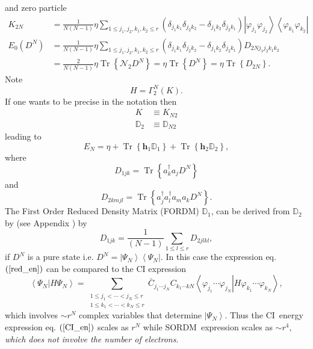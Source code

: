 \documentclass[aps,preprint]{revtex4}%
\begin{document}
and zero particle
\begin{align}
K_{2N}  &  =\frac{1}{N\left(  N-1\right)  }\eta\sum_{1\leq j_{1},j_{2}%
,k_{1},k_{2}\leq r}\left(  \delta_{j_{1}k_{1}}\delta_{j_{2}k_{2}}%
-\delta_{j_{1}k_{2}}\delta_{j_{2}k_{1}}\right)  \left\vert \varphi_{j_{1}%
}\varphi_{j_{2}}\right\rangle \left\langle \varphi_{k_{1}}\varphi_{k_{2}%
}\right\vert \nonumber\\
E_{0}\left(  D^{N}\right)   &  =\frac{1}{N\left(  N-1\right)  }\eta\sum_{1\leq
j_{1},j_{2},k_{1},k_{2}\leq r}\left(  \delta_{j_{1}k_{1}}\delta_{j_{2}k_{2}%
}-\delta_{j_{1}k_{2}}\delta_{j_{2}k_{1}}\right)  D_{2Nj_{1}j_{2}k_{1}k_{2}%
}\nonumber\\
&  =\frac{2}{N\left(  N-1\right)  }\eta\operatorname{Tr}\left\{
\mathcal{N}_{2}D^{N}\right\}  =\eta\operatorname{Tr}\left\{  D^{N}\right\}
=\eta\operatorname{Tr}\left\{  D_{2N}\right\}  .
\end{align}
Note
\begin{equation}
H=\Gamma_{2}^{N}\left(  K\right)  .
\end{equation}
If one wants to be precise in the notation then
\begin{align}
K  &  \equiv K_{N2}\\
\mathbb{D}_{2}  &  \equiv\mathbb{D}_{N2}%
\end{align}
leading to
\begin{equation}
E_{N}=\eta+\operatorname{Tr}\left\{  \mathbf{h}_{1}\mathbb{D}_{1}\right\}
+\operatorname{Tr}\left\{  \mathbf{h}_{2}\mathbb{D}_{2}\right\}  ,
\label{red_en}%
\end{equation}
where
\begin{equation}
D_{1jk}=\operatorname{Tr}\left\{  a_{k}^{\dagger}a_{j}D^{N}\right\}
\end{equation}
and
\begin{equation}
D_{2kmjl}=\operatorname{Tr}\left\{  a_{j}^{\dagger}a_{l}^{\dagger}a_{m}%
a_{k}D^{N}\right\}  .
\end{equation}
The First Order Reduced Density Matrix (FORDM) $\mathbb{D}_{1}$, can be
derived from $\mathbb{D}_{2}$ by (see Appendix ) by
\begin{equation}
D_{1jk}=\frac{1}{\left(  N-1\right)  }\sum_{1\leq l\leq r}D_{2jlkl},
\end{equation}
if $D^{N}$ is a pure state i.e. $D^{N}=\left\vert \Psi_{N}\right\rangle
\left\langle \Psi_{N}\right\vert .$ In this case the expression eq. $\left(
\ref{red_en}\right)  $ can be compared to the CI expression
\begin{equation}
\left\langle \Psi_{N}\left\vert H\Psi_{N}\right.  \right\rangle =\sum
_{\substack{1\leq j_{1}<\cdots<j_{N}\leq r\\1\leq k_{1}<\cdots<k_{N}\leq
r}}\bar{C}_{j_{1}\cdots j_{N}}C_{k_{1}\cdots kN}\left\langle \varphi_{j_{1}%
}\cdots\varphi_{j_{N}}\left\vert H\varphi_{k_{1}}\cdots\varphi_{k_{N}}\right.
\right\rangle , \label{CI_en}%
\end{equation}
which involves $\sim r^{N}$ complex variables that determine $\left\vert
\Psi_{N}\right\rangle .$ Thus the CI\ energy expression eq. $\left(
\ref{CI_en}\right)  $ scales as $r^{N}$ while SORDM\ expression scales as
$\sim r^{4},$ \emph{which does not involve the number of electrons}.
\end{document}
